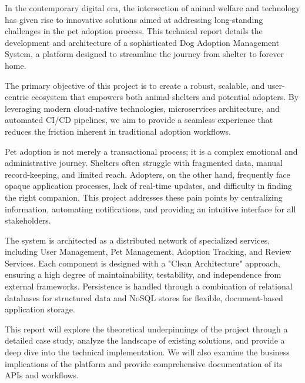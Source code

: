 In the contemporary digital era, the intersection of animal welfare and technology has given rise to innovative solutions aimed at addressing long-standing challenges in the pet adoption process. This technical report details the development and architecture of a sophisticated Dog Adoption Management System, a platform designed to streamline the journey from shelter to forever home.

The primary objective of this project is to create a robust, scalable, and user-centric ecosystem that empowers both animal shelters and potential adopters. By leveraging modern cloud-native technologies, microservices architecture, and automated CI/CD pipelines, we aim to provide a seamless experience that reduces the friction inherent in traditional adoption workflows.

Pet adoption is not merely a transactional process; it is a complex emotional and administrative journey. Shelters often struggle with fragmented data, manual record-keeping, and limited reach. Adopters, on the other hand, frequently face opaque application processes, lack of real-time updates, and difficulty in finding the right companion. This project addresses these pain points by centralizing information, automating notifications, and providing an intuitive interface for all stakeholders.

The system is architected as a distributed network of specialized services, including User Management, Pet Management, Adoption Tracking, and Review Services. Each component is designed with a "Clean Architecture" approach, ensuring a high degree of maintainability, testability, and independence from external frameworks. Persistence is handled through a combination of relational databases for structured data and NoSQL stores for flexible, document-based application storage.

This report will explore the theoretical underpinnings of the project through a detailed case study, analyze the landscape of existing solutions, and provide a deep dive into the technical implementation. We will also examine the business implications of the platform and provide comprehensive documentation of its APIs and workflows.
